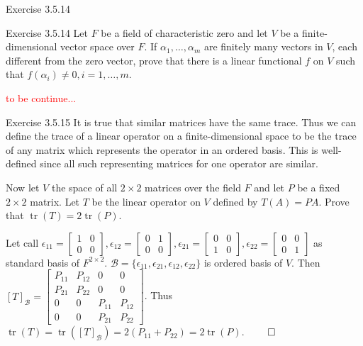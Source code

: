 \documentclass[8pt]{beamer}
\newcommand{\mc}[1]{\mathcal{#1}}
\newcommand{\tr}{\operatorname{tr}}
\begin{document}
\begin{frame}{Exercise 3.5.14}
    \begin{block}{Exercise 3.5.14}
        Let $F$ be a field of characteristic zero and let $V$ be a finite-dimensional vector space over $F$.
        If $\alpha_1, \dots, \alpha_m$ are finitely many vectors in $V$, each different from the zero vector, prove that there is a linear functional $f$ on $V$ such that $f(\alpha_i) \neq 0, i=1, \dots, m$.

        \textcolor{red}{to be continue...}
    \end{block}

    \begin{block}{Exercise 3.5.15}
        It is true that similar matrices have the same trace.
        Thus we can define the trace of a linear operator on a finite-dimensional space to be the trace of any matrix which represents the operator in an ordered basis.
        This is well-defined since all such representing matrices for one operator are similar.

        Now let $V$ the space of all $2\times 2$ matrices over the field $F$ and let $P$ be a fixed $2 \times 2$ matrix.
        Let $T$ be the linear operator on $V$ defined by $T(A) =PA$.
        Prove that $\tr(T) = 2 \tr(P)$.

        \smallskip
        Let call $\epsilon_{11} = \begin{bmatrix}
        1 & 0 \\ 0 & 0
        \end{bmatrix}, \epsilon_{12} = \begin{bmatrix}
        0 & 1 \\ 0 & 0
        \end{bmatrix}, \epsilon_{21} = \begin{bmatrix}
        0 & 0 \\ 1 & 0
        \end{bmatrix}, \epsilon_{22} = \begin{bmatrix}
        0 & 0 \\ 0 & 1
        \end{bmatrix}$ as standard basis of $F^{2 \times 2}$.
        $\mc{B} = \{\epsilon_{11}, \epsilon_{21}, \epsilon_{12}, \epsilon_{22}\}$ is ordered basis of $V$.
        Then $[T]_{\mc{B}} = \begin{bmatrix}
        P_{11} & P_{12} & 0 & 0 \\P_{21} & P_{22} & 0 & 0 \\ 0 & 0 & P_{11} & P_{12} \\ 0 & 0 & P_{21} & P_{22}
        \end{bmatrix}$.
        Thus $\tr (T) = \tr ([T]_{\mc{B}}) = 2(P_{11} + P_{22}) = 2\tr(P)$.
        $\qed$
    \end{block}
\end{frame}
\end{document}
